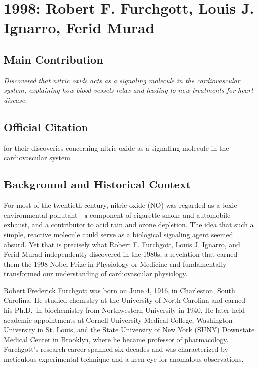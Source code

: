 \chapter[1998 --- Furchgott et al.]{1998: Robert F. Furchgott, Louis J. Ignarro, Ferid Murad}
\label{ch:1998_Furchgott}

\section*{Main Contribution}

\textit{Discovered that nitric oxide acts as a signaling molecule in the cardiovascular system, explaining how blood vessels relax and leading to new treatments for heart disease.}\cite{nobel-1998,lecture-1998}

\section{Official Citation}

for their discoveries concerning nitric oxide as a signalling molecule in the cardiovascular system

\section{Background and Historical Context}

For most of the twentieth century, nitric oxide (NO) was regarded as a toxic environmental pollutant---a component of cigarette smoke and automobile exhaust, and a contributor to acid rain and ozone depletion. The idea that such a simple, reactive molecule could serve as a biological signaling agent seemed absurd. Yet that is precisely what Robert F. Furchgott, Louis J. Ignarro, and Ferid Murad independently discovered in the 1980s, a revelation that earned them the 1998 Nobel Prize in Physiology or Medicine and fundamentally transformed our understanding of cardiovascular physiology.

Robert Frederick Furchgott was born on June 4, 1916, in Charleston, South Carolina. He studied chemistry at the University of North Carolina and earned his Ph.D.\ in biochemistry from Northwestern University in 1940. He later held academic appointments at Cornell University Medical College, Washington University in St. Louis, and the State University of New York (SUNY) Downstate Medical Center in Brooklyn, where he became professor of pharmacology. Furchgott's research career spanned six decades and was characterized by meticulous experimental technique and a keen eye for anomalous observations.

